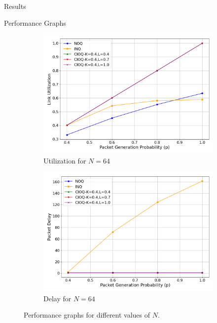 \begin{section}{Results}
\begin{subsection}{Performance Graphs}
\begin{figure}[htbp]
        \begin{subfigure}{0.45\textwidth}
            \centering
            \includegraphics[width=\linewidth]{./figures/fig2/utilization_plot_N_64.png}
            \caption{Utilization for \(N = 64\)}
            \label{fig:utilization_64}
        \end{subfigure}
        \hfill
        \begin{subfigure}{0.45\textwidth}
            \centering
            \includegraphics[width=\linewidth]{./figures/fig2/delay_plot_N_64.png}
            \caption{Delay for \(N = 64\)}
            \label{fig:delay_64}
        \end{subfigure}

        \caption{Performance graphs for different values of \(N\).}
        \label{fig:performance_graphs}
    \end{figure}


    \end{subsection}
    

\end{section}

